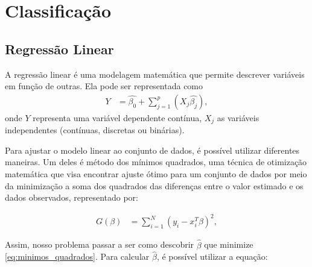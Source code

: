 \section{Classificação}


\subsection{Regressão Linear}


A regressão linear é uma modelagem matemática \footnotemark {} que permite descrever variáveis em função de outras. Ela pode ser representada como
\begin{equation}
  \label{eq:regressao_linear}
  \begin{aligned}
Y &= \hat{\beta_{0}} + \sum_{j=1}^{p} (X_{j}\hat{\beta_{j}}), 
  \end{aligned}  
\end{equation}
onde \begin{math}Y\end{math} representa uma variável dependente contínua, \begin{math}X_{j}\end{math} as variáveis independentes (contínuas, discretas ou binárias).

Para ajustar o modelo linear ao conjunto de dados, é possível utilizar diferentes maneiras. Um deles é método dos mínimos quadrados, uma técnica de otimização matemática que visa encontrar ajuste ótimo para um conjunto de dados por meio da minimização a soma dos quadrados das diferenças entre o valor estimado e os dados observados, representado por:

\begin{equation}
  \label{eq:minimos_quadrados}
  \begin{aligned}
G(\beta) &= \sum_{i=1}^{N} (y_{i}-x_{i}^{T}\beta)^{2}, 
  \end{aligned}  
\end{equation}

Assim, nosso problema passar a ser como descobrir \begin{math}\hat{\beta}\end{math} que minimize \ref{eq:minimos_quadrados}. Para calcular \begin{math}\hat{\beta}\end{math}, é possível utilizar a equação:

